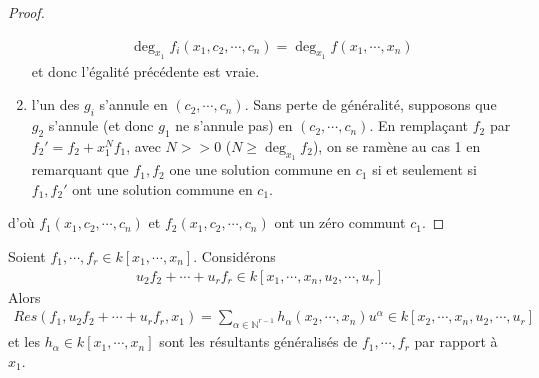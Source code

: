 \begin{proof}
\begin{enumerate}
                    \begin{align*}
                        \deg_{x_1} f_i(x_1, c_2, \cdots, c_n) = \deg_{x_1} f(x_1, \cdots, x_n)
                    \end{align*}
                    et donc l'égalité précédente est vraie.
                    \item l'un des $g_i$ s'annule en $(c_2, \cdots, c_n)$. Sans perte de généralité, supposons que $g_2$ s'annule (et donc $g_1$ ne s'annule pas) en $(c_2, \cdots, c_n)$. En remplaçant $f_2$ par $f_2' = f_2 + x_1^Nf_1$, avec $N >> 0$ ($N \geq \deg_{x_1}f_2$), on se ramène au cas 1 en remarquant que $f_1,f_2$ one une solution commune en $c_1$ si et seulement si $f_1, f_2'$ ont une solution commune en $c_1$.
                \end{enumerate}
                d'où $f_1(x_1, c_2, \cdots, c_n)$ et $f_2(x_1, c_2, \cdots, c_n)$ ont un zéro communt $c_1$.
            \end{proof}
            \begin{defi}
                Soient $f_1, \cdots, f_r \in k[x_1, \cdots, x_n]$. Considérons 
                \begin{align*}
                    u_2f_2 + \cdots + u_rf_r \in k[x_1, \cdots, x_n, u_2, \cdots, u_r]
                \end{align*}
                Alors
                \begin{align*}
                    Res(f_1, u_2f_2 + \cdots + u_rf_r, x_1) = \sum_{\alpha \in \mathbb{N}^{r-1}} h_\alpha(x_2, \cdots, x_n) u^\alpha \in k[x_2, \cdots, x_n, u_2, \cdots, u_r]
                \end{align*}
                et les $h_\alpha \in k[x_1, \cdots, x_n]$ sont les résultants généralisés de $f_1, \cdots, f_r$ par rapport à $x_1$.
            \end{defi}

